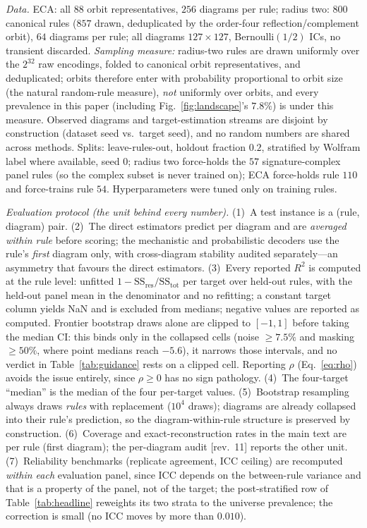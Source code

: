 \documentclass[aip,cha,amsmath,amssymb,reprint,floatfix]{revtex4-2}
\newcommand{\rtwo}{$R^2$}
\begin{document}
\emph{Data.} ECA: all $88$ orbit representatives, $256$ diagrams per rule;
radius two: $800$ canonical rules ($857$ drawn, deduplicated by the order-four
reflection/complement orbit), $64$ diagrams per rule; all diagrams
$127\times127$, Bernoulli$(1/2)$ ICs, no transient discarded. \emph{Sampling
measure:} radius-two rules are drawn uniformly over the $2^{32}$ raw
encodings, folded to canonical orbit representatives, and deduplicated;
orbits therefore enter with probability proportional to orbit size (the
natural random-rule measure), \emph{not} uniformly over orbits, and every
prevalence in this paper (including Fig.~\ref{fig:landscape}'s $7.8\%$) is
under this measure. Observed
diagrams and target-estimation streams are disjoint by construction (dataset
seed vs.\ target seed), and no random numbers are shared across methods.
Splits: leave-rules-out, holdout fraction $0.2$, stratified by Wolfram label
where available, seed $0$; radius two force-holds the $57$ signature-complex
panel rules (so the complex subset is never trained on); ECA force-holds rule
$110$ and force-trains rule $54$. Hyperparameters were tuned only on training
rules.

\emph{Evaluation protocol (the unit behind every number).} (1)~A test
instance is a (rule, diagram) pair. (2)~The direct estimators predict per
diagram and are \emph{averaged within rule} before scoring; the mechanistic
and probabilistic decoders use the rule's \emph{first} diagram only, with
cross-diagram stability audited separately---an asymmetry that favours the
direct estimators. (3)~Every reported \rtwo{} is computed at the
rule level: unfitted $1-\mathrm{SS}_{\mathrm{res}}/\mathrm{SS}_{\mathrm{tot}}$
per target over held-out rules, with the held-out panel mean in the
denominator and no refitting; a constant target column yields NaN and is
excluded from medians; negative values are reported as computed. Frontier
bootstrap draws alone are clipped to $[-1,1]$ before taking the median CI:
this binds only in the collapsed cells (noise ${\ge}7.5\%$ and masking
${\ge}50\%$, where point medians reach $-5.6$), it narrows those intervals,
and no verdict in Table~\ref{tab:guidance} rests on a clipped cell. Reporting
$\rho$ (Eq.~\eqref{eq:rho}) avoids the issue entirely, since $\rho\ge0$ has no
sign pathology. (4)~The
four-target ``median'' is the median of the four per-target values.
(5)~Bootstrap resampling always draws \emph{rules} with replacement ($10^4$
draws); diagrams are already collapsed into their rule's prediction, so the
diagram-within-rule structure is preserved by construction. (6)~Coverage and
exact-reconstruction rates in the main text are per rule (first diagram);
the per-diagram audit [rev.~11] reports the other unit. (7)~Reliability
benchmarks (replicate agreement, ICC ceiling) are recomputed \emph{within
each} evaluation panel, since ICC depends on the between-rule variance and
that is a property of the panel, not of the target; the post-stratified row
of Table~\ref{tab:headline} reweights its two strata to the universe
prevalence; the correction is small (no ICC moves by more than $0.010$).
\end{document}
